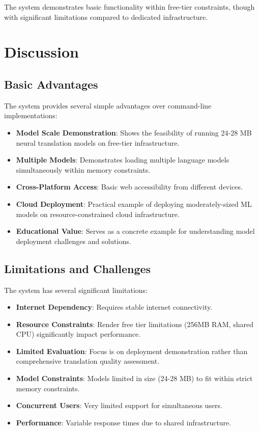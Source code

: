 \documentclass[conference]{IEEEtran}
\begin{document}
The system demonstrates basic functionality within free-tier constraints, though with significant limitations compared to dedicated infrastructure.

\section{Discussion}

\subsection{Basic Advantages}

The system provides several simple advantages over command-line implementations:

\begin{itemize}
    \item \textbf{Model Scale Demonstration}: Shows the feasibility of running 24-28 MB neural translation models on free-tier infrastructure.
    \item \textbf{Multiple Models}: Demonstrates loading multiple language models simultaneously within memory constraints.
    \item \textbf{Cross-Platform Access}: Basic web accessibility from different devices.
    \item \textbf{Cloud Deployment}: Practical example of deploying moderately-sized ML models on resource-constrained cloud infrastructure.
    \item \textbf{Educational Value}: Serves as a concrete example for understanding model deployment challenges and solutions.
\end{itemize}

\subsection{Limitations and Challenges}

The system has several significant limitations:

\begin{itemize}
    \item \textbf{Internet Dependency}: Requires stable internet connectivity.
    \item \textbf{Resource Constraints}: Render free tier limitations (256MB RAM, shared CPU) significantly impact performance.
    \item \textbf{Limited Evaluation}: Focus is on deployment demonstration rather than comprehensive translation quality assessment.
    \item \textbf{Model Constraints}: Models limited in size (24-28 MB) to fit within strict memory constraints.
    \item \textbf{Concurrent Users}: Very limited support for simultaneous users.
    \item \textbf{Performance}: Variable response times due to shared infrastructure.
\end{itemize}
\end{document}
